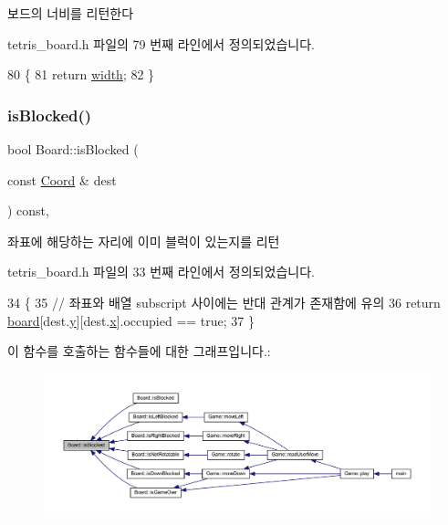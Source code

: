 보드의 너비를 리턴한다 



tetris\+\_\+board.\+h 파일의 79 번째 라인에서 정의되었습니다.


\begin{DoxyCode}
80     \{
81         \textcolor{keywordflow}{return} \mbox{\hyperlink{class_board_a5c5b64d99e3c653c425206d2babf2f97}{width}};
82     \}
\end{DoxyCode}
\mbox{\label{class_board_a61ff9b1284e5c3e1214a780361ed650b}} 
\subsubsection{\texorpdfstring{is\+Blocked()}{isBlocked()}\hspace{0.1cm}{\footnotesize\ttfamily [1/2]}}
{\footnotesize\ttfamily bool Board\+::is\+Blocked (\begin{DoxyParamCaption}\item[{const \mbox{\hyperlink{struct_coord}{Coord}} \&}]{dest }\end{DoxyParamCaption}) const\hspace{0.3cm}{\ttfamily [inline]}, {\ttfamily [private]}}



좌표에 해당하는 자리에 이미 블럭이 있는지를 리턴 



tetris\+\_\+board.\+h 파일의 33 번째 라인에서 정의되었습니다.


\begin{DoxyCode}
34     \{
35         \textcolor{comment}{// 좌표와 배열 subscript 사이에는 반대 관계가 존재함에 유의}
36         \textcolor{keywordflow}{return} \mbox{\hyperlink{class_board_ad26aada4f19d2ca0c7bd534e8f466b6b}{board}}[dest.\mbox{\hyperlink{struct_coord_a214166cca70cef7dda9201689c3e81ab}{y}}][dest.\mbox{\hyperlink{struct_coord_a696eaa744360fc791d0e3b331c549dbe}{x}}].occupied == \textcolor{keyword}{true};   
37     \}
\end{DoxyCode}
이 함수를 호출하는 함수들에 대한 그래프입니다.\+:
\nopagebreak
\begin{figure}[H]
\begin{center}
\leavevmode
\includegraphics[width=350pt]{class_board_a61ff9b1284e5c3e1214a780361ed650b_icgraph}
\end{center}
\end{figure}
\mbox{\label{class_board_a1ba0d2a44e1469738220b5ff7dfda6fc}} 
